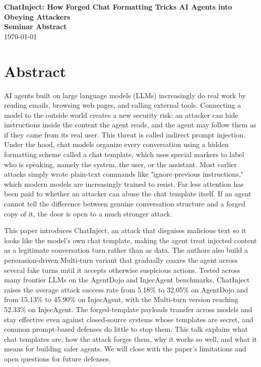 \documentclass[12pt]{article}
\newcommand{\seminardate}{\today}
\begin{document}
\begin{center}
  {\LARGE\bfseries ChatInject: How Forged Chat Formatting Tricks AI Agents into Obeying Attackers}\\[8pt]
  {\large\bfseries Seminar Abstract}\\[6pt]
  {\normalsize \seminardate}
\end{center}
\vspace{1.5em}

\section*{Abstract}
AI agents built on large language models (LLMs) increasingly do real work by reading emails, browsing web pages, and calling external tools. Connecting a model to the outside world creates a new security risk: an attacker can hide instructions inside the content the agent reads, and the agent may follow them as if they came from its real user. This threat is called indirect prompt injection. Under the hood, chat models organize every conversation using a hidden formatting scheme called a chat template, which uses special markers to label who is speaking, namely the system, the user, or the assistant. Most earlier attacks simply wrote plain-text commands like "ignore previous instructions," which modern models are increasingly trained to resist. Far less attention has been paid to whether an attacker can abuse the chat template itself. If an agent cannot tell the difference between genuine conversation structure and a forged copy of it, the door is open to a much stronger attack.

This paper introduces ChatInject, an attack that disguises malicious text so it looks like the model's own chat template, making the agent treat injected content as a legitimate conversation turn rather than as data. The authors also build a persuasion-driven Multi-turn variant that gradually coaxes the agent across several fake turns until it accepts otherwise suspicious actions. Tested across many frontier LLMs on the AgentDojo and InjecAgent benchmarks, ChatInject raises the average attack success rate from 5.18\% to 32.05\% on AgentDojo and from 15.13\% to 45.90\% on InjecAgent, with the Multi-turn version reaching 52.33\% on InjecAgent. The forged-template payloads transfer across models and stay effective even against closed-source systems whose templates are secret, and common prompt-based defenses do little to stop them. This talk explains what chat templates are, how the attack forges them, why it works so well, and what it means for building safer agents. We will close with the paper's limitations and open questions for future defenses.
\end{document}
